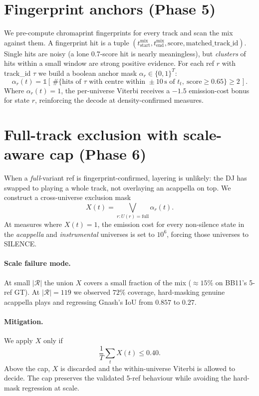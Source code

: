 \documentclass[11pt,a4paper]{article}
\begin{document}
\section{Fingerprint anchors (Phase 5)}

We pre-compute chromaprint fingerprints for every track and scan the mix against them. A fingerprint hit is a tuple $(t^{\text{mix}}_\text{start}, t^{\text{mix}}_\text{end}, \text{score}, \text{matched\_track\_id})$. Single hits are noisy (a lone 0.7-score hit is nearly meaningless), but \emph{clusters} of hits within a small window are strong positive evidence. For each ref $r$ with track\_id $\tau$ we build a boolean anchor mask $\alpha_r \in \{0,1\}^T$:
\[
\alpha_r(t) = \mathbb{1}\!\left[\,\#\{\text{hits of }\tau \text{ with centre within } \pm10\,\text{s of } t_t,\ \text{score} \ge 0.65\} \ge 2\,\right].
\]
Where $\alpha_r(t) = 1$, the per-universe Viterbi receives a $-1.5$ emission-cost bonus for state $r$, reinforcing the decode at density-confirmed measures.

\section{Full-track exclusion with scale-aware cap (Phase 6)}
\label{sec:phase6}

When a \emph{full}-variant ref is fingerprint-confirmed, layering is unlikely: the DJ has swapped to playing a whole track, not overlaying an acappella on top. We construct a cross-universe exclusion mask
\[
X(t) = \bigvee_{r : U(r) = \text{full}} \alpha_r(t).
\]
At measures where $X(t) = 1$, the emission cost for every non-silence state in the \emph{acappella} and \emph{instrumental} universes is set to $10^6$, forcing those universes to SILENCE.

\paragraph{Scale failure mode.} At small $|\mathcal{R}|$ the union $X$ covers a small fraction of the mix ($\approx 15\%$ on BB11's 5-ref GT). At $|\mathcal{R}| = 119$ we observed $72\%$ coverage, hard-masking genuine acappella plays and regressing Gnash's IoU from $0.857$ to $0.27$.

\paragraph{Mitigation.} We apply $X$ only if
\[
\frac{1}{T}\sum_t X(t) \leq 0.40.
\]
Above the cap, $X$ is discarded and the within-universe Viterbi is allowed to decide. The cap preserves the validated 5-ref behaviour while avoiding the hard-mask regression at scale.
\end{document}
